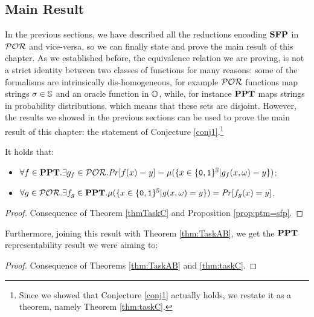 \subsection{Main Result}
\label{sec:mainresult}

In the previous sections, we have described all the reductions encoding $\mathbf{SFP}$ in $\mathcal{POR}$
and vice-versa, so we can finally state and prove the main result of this chapter.
%
As we established before,
the equivalence relation we are proving, is not a strict identity between two classes of functions for many reasons: some of the formalisms are intrinsically dis-homogeneous, for example $\mathcal{POR}$ functions map strings $\sigma \in \mathbb{S}$ and an oracle function in $\mathbb{O}$, while, for instance $\mathbf{PPT}$ maps strings in probability distributions, which means that these sets are disjoint.
%
However, the results we showed in the previous sections can be used to prove the main result of this chapter: the statement of Conjecture \ref{conj1}.\footnote{Since we showed that Conjecture \ref{conj1} actually holds, we restate it as a theorem, namely Theorem \ref{thm:taskC}.}



\begin{theorem}
  \label{thm:taskC}
It holds that:
  \begin{itemize}
    \item $\forall f\in \mathbf{PPT}. \exists g_f \in \mathcal{POR}. \mathit{Pr}[f(x)=y]=
    \mu(\{x \in \{\mathtt{0}, \mathtt{1}\}^{\mathbb{S}} | g_f(x, \omega)=y\})$;
    \item $\forall g \in \mathcal{POR}. \exists f_g \in \mathbf{PPT}.
     \mu(\{x \in \{\mathtt{0}, \mathtt{1}\}^{\mathbb{S}} | g(x, \omega)=y\})=\mathit{Pr}[f_g(x)=y]$.
  \end{itemize}
\end{theorem}

\begin{proof}
  Consequence of Theorem \ref{thmTaskC} and Proposition \ref{prop:ptm=sfp}.
\end{proof}
\noindent
Furthermore, joining this result with Theorem \ref{thm:TaskAB}, we get the
$\mathbf{PPT}$ representability result we were aiming to:

\pptrepr*
\begin{proof}
  Consequence of Theorems \ref{thm:TaskAB} and \ref{thm:taskC}.
\end{proof}
